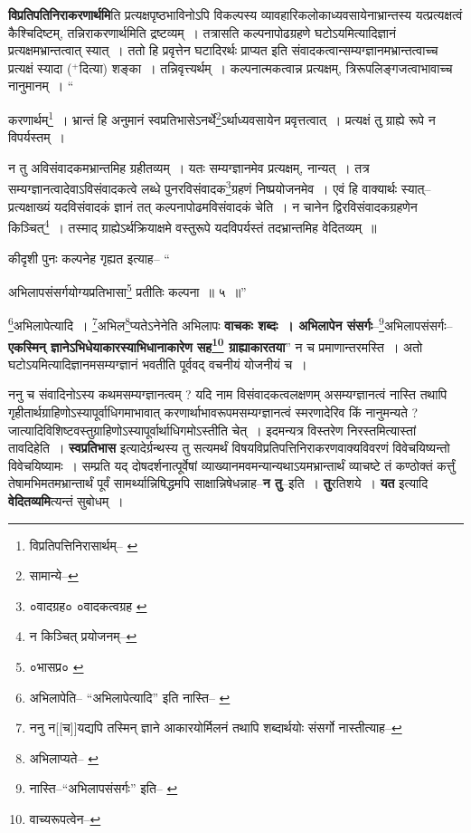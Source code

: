 \documentclass[article,12pt,a4paper]{memoir}
\newcommand{\add}[1]{($^{+}$#1)}
\begin{document}
	  \pstart \textbf{विप्रतिपतिनिराकरणार्थमि}ति प्रत्यक्षपृष्ठभाविनोऽपि विकल्पस्य व्यावहारिकलोकाध्यवसायेनाभ्रान्तस्य यत्प्रत्यक्षत्वं कैश्चिदिष्टम्, तन्नि\leavevmode{}राकरणार्थमिति द्रष्टव्यम् । तत्रासति कल्पनापोढग्रहणे घटोऽयमित्यादिज्ञानं प्रत्यक्षमभ्रान्तत्वात् स्यात् । ततो हि प्रवृत्तेन घटादिरर्थः प्राप्यत इति संवादकत्वान्सम्यग्ज्ञानमभ्रान्तत्वाच्च प्रत्यक्षं स्यादा \add{दित्या} शङ्का । तन्निवृत्त्यर्थम् । कल्पनात्मकत्वान्न प्रत्यक्षम्, त्रिरूपलिङ्गजत्वाभावाच्च नानुमानम् ।  \leavevmode{} “
	  
	करणार्थम्\footnote{विप्रतिपत्तिनिरासार्थम्--\cite{dp-msB} \cite{dp-msC} \cite{dp-msD} \cite{dp-edN}} । भ्रान्तं हि अनुमानं स्वप्रतिभासेऽनर्थे\footnote{सामान्ये--\cite{dp-msD-n}}ऽर्थाध्यवसायेन प्रवृत्तत्वात् । प्रत्यक्षं तु ग्राह्ये रूपे न विपर्यस्तम् । 
	  
	न तु अविसंवादकमभ्रान्तमिह ग्रहीतव्यम् । यतः सम्यग्ज्ञानमेव प्रत्यक्षम्, नान्यत् । तत्र सम्यग्ज्ञानत्वादेवाऽविसंवादकत्वे लब्धे पुनरविसंवादक\footnote{०वादग्रह० \cite{dp-edE} ०वादकत्वग्रह \cite{dp-msC}}ग्रहणं निष्प्रयोजनमेव । एवं हि वाक्यार्थः स्यात्--प्रत्यक्षाख्यं यदविसंवादकं ज्ञानं तत् कल्पनापोढमविसंवादकं चेति । न चानेन द्विरविसंवादकग्रहणेन किञ्चित्\footnote{न किञ्चित् प्रयोजनम्--\cite{dp-msD-n}} । तस्माद् ग्राह्येऽर्थक्रियाक्षमे वस्तुरूपे यदविपर्यस्तं तदभ्रान्तमिह वेदितव्यम् ॥ 
	  
	कीदृशी पुनः कल्पनेह गृह्यत इत्याह-- “
	  
	अभिलापसंसर्गयोग्यप्रतिभासा\footnote{०भासप्र० \cite{dp-msB} \cite{dp-edP} \cite{dp-edE} \cite{dp-edH} \cite{dp-edN}} प्रतीतिः कल्पना ॥ ५ ॥” 
	  
	\footnote{अभिलापेति--\cite{dp-edE} \cite{dp-edP} “अभिलापेत्यादि” इति नास्ति--\cite{dp-msA} \cite{dp-msB} \cite{dp-edH} \cite{dp-edN}}अभिलापेत्यादि । \footnote{ननु न[[च]]यद्यपि तस्मिन् ज्ञाने आकारयोर्मिलनं तथापि शब्दार्थयोः संसर्गो नास्तीत्याह--\cite{dp-msD-n}}अभिल\footnote{अभिलाप्यते--\cite{dp-msA} \cite{dp-edP} \cite{dp-edH} \cite{dp-edE}}प्यतेऽनेनेति अभिलापः \textbf{वाचकः शब्दः । अभिलापेन संसर्गः}--\footnote{नास्ति--“अभिलापसंसर्गः” इति--\cite{dp-msA} \cite{dp-edP} \cite{dp-edE}}अभिलापसंसर्गः--\textbf{एकस्मिन् ज्ञानेऽभिधेयाकारस्याभिधानाकारेण सह\footnote{वाच्यरूपत्वेन--\cite{dp-msD-n}} ग्राह्याकारतया}” न च प्रमाणान्तरमस्ति । अतो घटोऽयमित्यादिज्ञानमसम्यग्ज्ञानं भवतीति पूर्ववद् वचनीयं योजनीयं च ।
	\pend
      

	  \pstart ननु च संवादिनोऽस्य कथमसम्यग्ज्ञानत्वम् ? यदि नाम विसंवादकत्वलक्षणम् असम्यग्ज्ञानत्वं नास्ति तथापि गृहीतार्थग्राहिणोऽस्यापूर्वाधिगमाभावात् करणार्थाभावरूपमसम्यग्ज्ञानत्वं स्मरणादेरिव किं नानुमन्यते ? जात्यादिविशिष्टवस्तुग्राहिणोऽस्यापूर्वार्थाधिगमोऽस्तीति चेत् । इदमन्यत्र विस्तरेण निरस्तमित्यास्तां तावदिहेति । \textbf{स्वप्रतिभास} इत्यादेर्ग्रन्थस्य तु सत्यमर्थं विषयविप्रतिपत्तिनिराकरणवाक्यविवरणं विवेचयिष्यन्तो विवेचयिष्यामः । सम्प्रति यद् दोषदर्शनात्पूर्वेषां व्याख्यानमवमन्यान्यथाऽयमभ्रान्तार्थं व्याचष्टे तं कण्ठोक्तं कर्त्तुं तेषामभिमतमभ्रान्तार्थं पूर्वं सामर्थ्यान्निषिद्धमपि साक्षान्निषेधन्नाह--\textbf{न तु}--इति । \textbf{तु}रतिशये । \textbf{यत} इत्यादि \textbf{वेदितव्यमि}त्यन्तं सुबोधम् ।
	\pend
      
\end{document}
